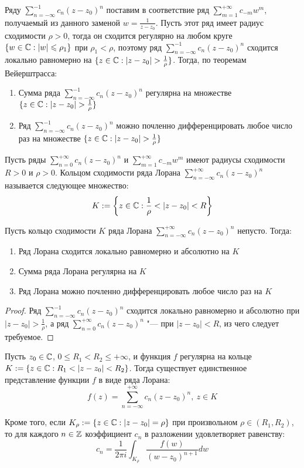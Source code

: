 \begin{note}
	Ряду $\sum_{n = -\infty}^{-1}c_n(z - z_0)^n$ поставим в соответствие ряд $\sum_{m = 1}^{+\infty}c_{-m}w^m$, получаемый из данного заменой $w = \frac1{z - z_0}$. Пусть этот ряд имеет радиус сходимости $\rho > 0$, тогда он сходится регулярно на любом круге $\{w \in \mathbb{C}: |w| \leqslant \rho_1\}$ при $\rho_1 < \rho$, поэтому ряд $\sum_{n = -\infty}^{-1}c_n(z - z_0)^n$ сходится локально равномерно на $\{z \in \mathbb{C}: |z - z_0| > \frac1\rho\}$. Тогда, по теоремам Вейерштрасса:
	\begin{enumerate}
		\item Сумма ряда $\sum_{n = -\infty}^{-1}c_n(z - z_0)^n$ регулярна на множестве $\{z \in \mathbb{C}: |z - z_0| > \frac1\rho\}$
		\item Ряд $\sum_{n = -\infty}^{-1}c_n(z - z_0)^n$ можно почленно дифференцировать любое число раз на множестве $\{z \in \mathbb{C}: |z - z_0| > \frac1\rho\}$
	\end{enumerate}
\end{note}

\begin{definition}
	Пусть ряды $\sum_{n = 0}^{+\infty}c_n(z - z_0)^n$ и $\sum_{m = 1}^{+\infty}c_{-m}w^m$ имеют радиусы сходимости $R > 0$ и $\rho > 0$. Кольцом сходимости ряда Лорана $\sum_{n = -\infty}^{+\infty}c_n(z - z_0)^n$ называется следующее множество:
	\[K := \left\{z \in \mathbb{C}: \frac1\rho < |z - z_0| < R\right\}\]
\end{definition}

\begin{proposition}
	Пусть кольцо сходимости $K$ ряда Лорана $\sum_{n = -\infty}^{+\infty}c_n(z - z_0)^n$ непусто. Тогда:
	\begin{enumerate}
		\item Ряд Лорана сходится локально равномерно и абсолютно на $K$
		\item Сумма ряда Лорана регулярна на $K$
		\item Ряд Лорана можно почленно дифференцировать любое число раз на $K$
	\end{enumerate}
\end{proposition}

\begin{proof}
	Ряд $\sum_{n = -\infty}^{-1}c_n(z - z_0)^n$ сходится локально равномерно и абсолютно при $|z - z_0| > \frac{1}\rho$, а ряд $\sum_{n = 0}^{+\infty}c_n(z - z_0)^n$ "--- при $|z - z_0| < R$, из чего следует требуемое.
\end{proof}

\begin{theorem}
	Пусть $z_0 \in \mathbb{C}$, $0 \le R_1 < R_2 \le +\infty$, и функция $f$ регулярна на кольце $K := \{z \in \mathbb{C}: R_1 < |z - z_0| < R_2\}$. Тогда существует единственное представление функции $f$ в виде ряда Лорана:
	\[f(z) = \sum_{n = -\infty}^{+\infty}c_n(z - z_0)^n,~z \in K\]
	
	Кроме того, если $K_\rho := \{z \in \mathbb{C}: |z - z_0| = \rho\}$ при произвольном $\rho \in (R_1, R_2)$, то для каждого $n \in \mathbb{Z}$ коэффициент $c_n$ в разложении удовлетворяет равенству:
	\[c_n = \frac1{2\pi i}\int_{K_{\rho}} \frac{f(w)}{(w - z_0)^{n+1}}dw\]
\end{theorem}

